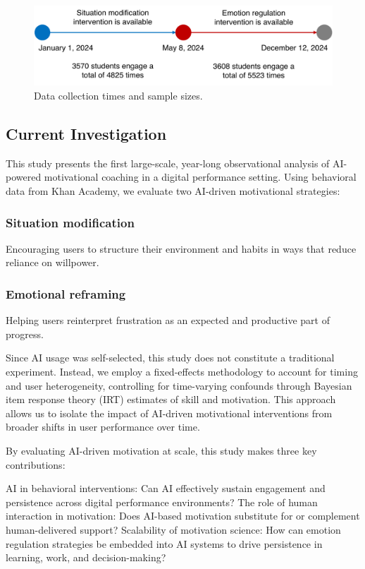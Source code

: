 \documentclass[11pt]{report}
\begin{document}
\begin{mainf}
\begin{figure}[ht]
    \centering
    \includegraphics[width=0.95\linewidth]{sample.pdf}
    \caption{Data collection times and sample sizes.}
    \label{fig:sample}
\end{figure}


\subsection{Current Investigation}
This study presents the first large-scale, year-long observational analysis of AI-powered motivational coaching in a digital performance setting. 
Using behavioral data from Khan Academy, we evaluate two AI-driven motivational strategies:

\subsubsection{Situation modification} Encouraging users to structure their environment and habits in ways that reduce reliance on willpower.
\subsubsection{Emotional reframing} Helping users reinterpret frustration as an expected and productive part of progress.
 
Since AI usage was self-selected, this study does not constitute a traditional experiment. 
Instead, we employ a fixed-effects methodology to account for timing and user heterogeneity, controlling for time-varying confounds through Bayesian item response theory (IRT) estimates of skill and motivation. 
This approach allows us to isolate the impact of AI-driven motivational interventions from broader shifts in user performance over time.

By evaluating AI-driven motivation at scale, this study makes three key contributions:

AI in behavioral interventions: Can AI effectively sustain engagement and persistence across digital performance environments?
The role of human interaction in motivation: Does AI-based motivation substitute for or complement human-delivered support?
Scalability of motivation science: How can emotion regulation strategies be embedded into AI systems to drive persistence in learning, work, and decision-making?


\end{mainf}
\end{document}
